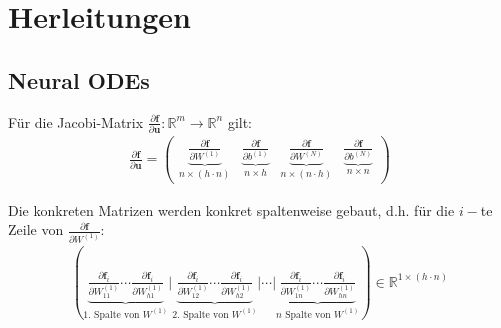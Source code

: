 \documentclass[a4paper, 12pt]{scrartcl}
\begin{document}
\section{Herleitungen}

\subsection{Neural ODEs}
Für die Jacobi-Matrix 
$\frac{\partial \bm{f}}{\partial \bm{u}}: \mathbb{R}^{m} \to \mathbb{R}^n$ gilt:
\begin{align*}
    \frac{\partial \bm{f}}{\partial \bm{u}} 
    =
    \begin{pmatrix}
        \underbrace{
            \frac{\partial \bm{f}}{\partial W^{(1)}}
        }_{
            n \times (h \cdot n)
        } 
        &
        \underbrace{
            \frac{\partial \bm{f}}{\partial b^{(1)}}
        }_{
            n \times h
        }
        &
        \underbrace{
            \frac{\partial \bm{f}}{\partial W^{(N)}}
        }_{
            n \times (n \cdot h)
        }
        &
        \underbrace{
            \frac{\partial \bm{f}}{\partial b^{(N)}}
        }_{
            n \times n
        } 
    \end{pmatrix}
\end{align*}

Die konkreten Matrizen werden konkret spaltenweise gebaut, d.h. für die $i-$te Zeile 
von $\frac{\partial \bm{f}}{\partial W^{(1)}}$:
\begin{align*}
    \left(
        \underbrace{
            \frac{\partial \bm{f}_i}{\partial W^{(1)}_{11}} 
        \cdots
        \frac{\partial \bm{f}_i}{\partial W^{(1)}_{h1}}
        }_{
            1.\text{ Spalte von } W^{(1)}
        }
        \bigg| 
        \underbrace{
            \frac{\partial \bm{f}_i}{\partial W^{(1)}_{12}} 
            \cdots
            \frac{\partial \bm{f}_i}{\partial W^{(1)}_{h2}}
        }_{
            2.\text{ Spalte von } W^{(1)}
        }
        \bigg|
        \cdots
        \bigg|
        \underbrace{
            \frac{\partial \bm{f}_i}{\partial W^{(1)}_{1n}} 
            \cdots
            \frac{\partial \bm{f}_i}{\partial W^{(1)}_{hn}}
        }_{
            n \text{ Spalte von } W^{(1)}
        }
    \right)
    \in \mathbb{R}^{1 \times (h \cdot n)}
\end{align*}
\end{document}
